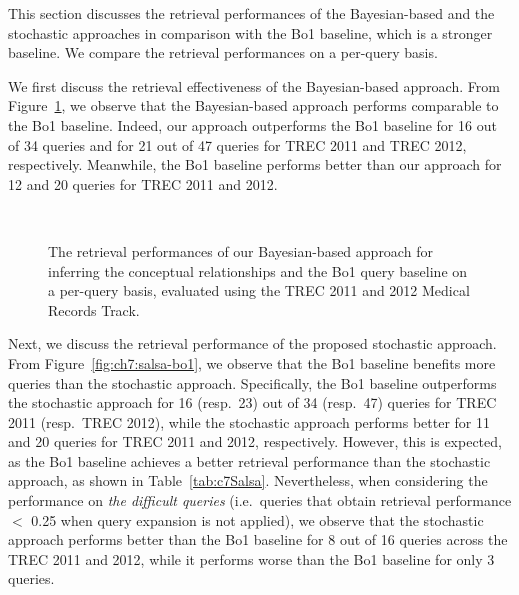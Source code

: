 \documentclass[1p]{elsarticle}
\begin{document}

This section discusses the retrieval performances of the Bayesian-based and the stochastic approaches in comparison with the Bo1 baseline, which is a stronger baseline. We compare the retrieval performances on a per-query basis.

We first discuss the retrieval effectiveness of the Bayesian-based approach. From Figure~\ref{fig:ch7:bayesian-bo1}, we observe that the Bayesian-based approach performs comparable to the Bo1 baseline. Indeed, our approach outperforms the Bo1 baseline for 16 out of 34 queries and for 21 out of 47 queries for TREC 2011 and TREC 2012, respectively. Meanwhile, the Bo1 baseline performs better than our approach for 12 and 20 queries for TREC 2011 and 2012. 
% 

\begin{figure}[tb]
\centering
        \\%
    \caption{%
        The retrieval performances of our Bayesian-based approach for inferring the conceptual relationships and the Bo1 query baseline on a per-query basis, evaluated using the TREC 2011 and 2012 Medical Records Track.
     }%
   \label{fig:ch7:bayesian-bo1}
\end{figure}


Next, we discuss the retrieval performance of the proposed stochastic approach. From Figure~\ref{fig:ch7:salsa-bo1}, we observe that the Bo1 baseline benefits more queries than the stochastic approach. Specifically, the Bo1 baseline outperforms the stochastic approach for 16 (resp.\ 23) out of 34 (resp.\ 47) queries for TREC 2011 (resp.\ TREC 2012), while the stochastic approach performs better for 11 and 20 queries for TREC 2011 and 2012, respectively. However, this is expected, as the Bo1 baseline achieves a better retrieval performance than the stochastic approach, as shown in Table~\ref{tab:c7Salsa}. Nevertheless, when considering the performance on \emph{the difficult queries} (i.e.\ queries that obtain retrieval performance $<$ 0.25 when query expansion is not applied), we observe that the stochastic approach performs better than the Bo1 baseline for 8 out of 16 queries across the TREC 2011 and 2012, while it performs worse than the Bo1 baseline for only 3 queries.
\end{document}
